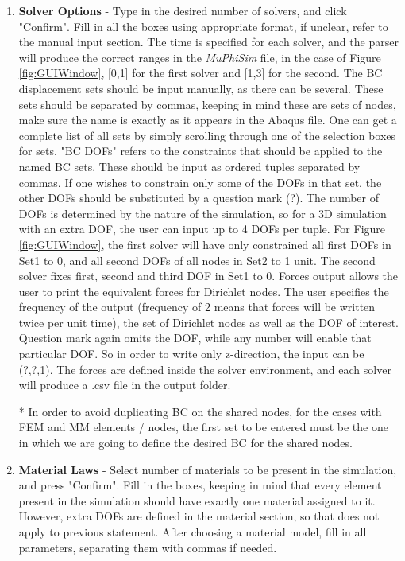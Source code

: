 \documentclass[oneside,11pt,times]{book}
\begin{document}
\begin{enumerate}
\item\textbf{Solver Options} - Type in the desired number of solvers, and click "Confirm". Fill in all the boxes using appropriate format, if unclear, refer to the manual input section. The time is specified for each solver, and the parser will produce the correct ranges in the \textit{MuPhiSim} file, in the case of Figure \ref{fig:GUIWindow}, [0,1] for the first solver and [1,3] for the second. The BC displacement sets should be input manually, as there can be several. These sets should be separated by commas, keeping in mind these are sets of nodes, make sure the name is exactly as it appears in the Abaqus file. One can get a complete list of all sets by simply scrolling through one of the selection boxes for sets. "BC DOFs" refers to the constraints that should be applied to the named BC sets. These should be input as ordered tuples separated by commas. If one wishes to constrain only some of the DOFs in that set, the other DOFs should be substituted by a question mark (?). The number of DOFs is determined by the nature of the simulation, so for a 3D simulation with an extra DOF, the user can input up to 4 DOFs per tuple. For Figure \ref{fig:GUIWindow}, the first solver will have only constrained all first DOFs in Set1 to 0, and all second DOFs of all nodes in Set2 to 1 unit. The second solver fixes first, second and third DOF in Set1 to 0. Forces output allows the user to print the equivalent forces for Dirichlet nodes. The user specifies the frequency of the output (frequency of 2 means that forces will be written twice per unit time), the set of Dirichlet nodes as well as the DOF of interest. Question mark again omits the DOF, while any number will enable that particular DOF. So in order to write only z-direction, the input can be (?,?,1). The forces are defined inside the solver environment, and each solver will produce a .csv file in the output folder.

* In order to avoid duplicating BC on the shared nodes, for the cases with FEM and MM elements / nodes, the first set to be entered must be the one in which we are going to define the desired BC for the shared nodes.

\item\textbf{Material Laws} - Select number of materials to be present in the simulation, and press "Confirm". Fill in the boxes, keeping in mind that every element present in the simulation should have exactly one material assigned to it. However, extra DOFs are defined in the material section, so that does not apply to previous statement. After choosing a material model, fill in all parameters, separating them with commas if needed.


\end{enumerate}
\end{document}
